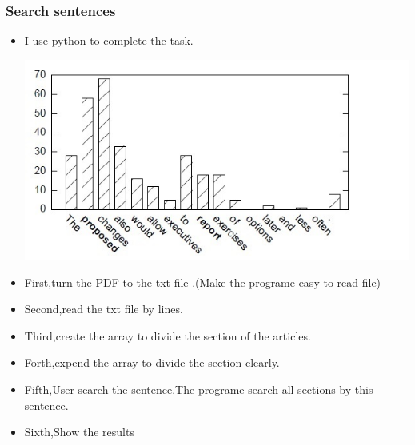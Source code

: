 \subsubsection*{Search sentences}
\begin{itemize}
	\item I use python to complete the task. 
	\begin{center}
		\includegraphics[width=0.8\columnwidth]{Union_Background_Chart_2}
	\end{center}
	\item First,turn the PDF to the txt file .(Make the programe easy to read file)\\ 
	\item Second,read the txt file by lines.\\ 	
	\item Third,create the array to divide the section of the articles.\\ 	
	\item Forth,expend the array to divide the section clearly.\\ 	
	\item Fifth,User search the sentence.The programe search all sections by this sentence.\\
	\item Sixth,Show the results\\  		
	
\end{itemize}

\newpage %